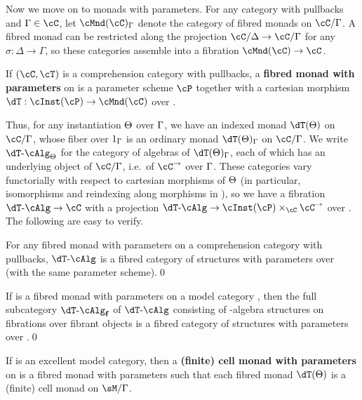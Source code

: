 \documentclass{amsart}
\let\P\cP
\def\alg{\text{-}\cAlg}
\def\algf{\alg_{\mathbf{f}}}
\let\C\cC
\let\T\cT
\begin{document}
Now we move on to monads with parameters.
For any category \C with pullbacks and $\Gamma\in\C$, let $\cMnd(\C)_\Gamma$ denote the category of fibred monads on $\C/\Gamma$.
A fibred monad can be restricted along the projection $\C/\Delta\to\C/\Gamma$ for any $\sigma:\Delta\to\Gamma$, so these categories assemble into a fibration $\cMnd(\C) \to \C$.

\begin{defn}
  If $(\C,\T)$ is a comprehension category with pullbacks, a \textbf{fibred monad with parameters} on \C is a parameter scheme $\P$ together with a cartesian morphism $\dT:\cInst(\P) \to \cMnd(\C)$ over \C.
\end{defn}

Thus, for any instantiation $\Theta$ over $\Gamma$, we have an indexed monad $\dT(\Th)$ on $\C/\Gm$, whose fiber over $1_\Gamma$ is an ordinary monad $\dT(\Th)_\Gm$ on $\C/\Gm$.
We write $\dT\alg_{\Th}$ for the category of algebras of $\dT(\Th)_\Gm$, each of which has an underlying object of $\C/\Gamma$, i.e.\ of $\C^\to$ over $\Gamma$.
These categories vary functorially with respect to cartesian morphisms of $\Theta$ (in particular, isomorphisms and reindexing along morphisms in \C), so we have a fibration $\dT\alg \to \C$ with a projection $\dT\alg \to \cInst(\P)\times_\C \C^\to$ over \C.
The following are easy to verify.

\begin{lem}
  For any fibred monad with parameters \dT on a comprehension category \C with pullbacks, $\dT\alg$ is a fibred category of structures with parameters over \C (with the same parameter scheme).\qed
\end{lem}

\begin{lem}
  If \dT is a fibred monad with parameters on a model category \sM, then the full subcategory $\dT\algf$ of $\dT\alg$ consisting of \dT-algebra structures on fibrations over fibrant objects is a fibred category of structures with parameters over \Mf.\qed
\end{lem}

\begin{defn}\label{defn:cell-param}
  If \sM is an excellent model category, then a \textbf{(finite) cell monad with parameters} on \sM is a fibred monad with parameters such that each fibred monad $\dT(\Th)$ is a (finite) cell monad on $\sM/\Gamma$.
\end{defn}
\end{document}
